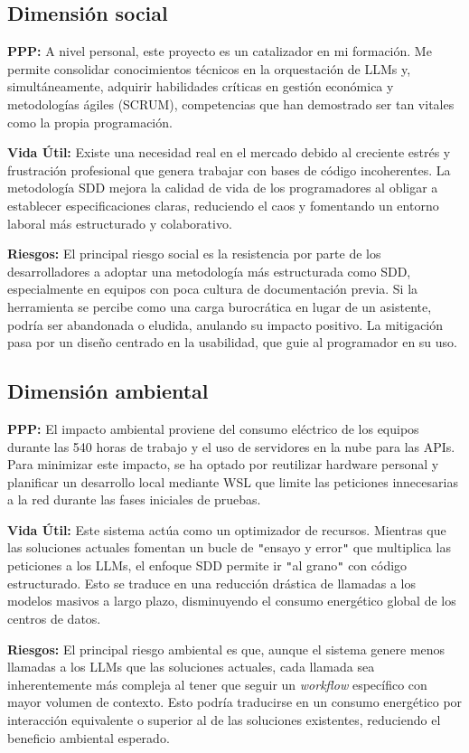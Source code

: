 \documentclass[11pt, letterpaper]{article}
\begin{document}
\subsection{Dimensión social}
\textbf{PPP:} A nivel personal, este proyecto es un catalizador en mi formación. Me permite consolidar conocimientos técnicos en la orquestación de LLMs y, simultáneamente, adquirir habilidades críticas en gestión económica y metodologías ágiles (SCRUM), competencias que han demostrado ser tan vitales como la propia programación.

\textbf{Vida Útil:} Existe una necesidad real en el mercado debido al creciente estrés y frustración profesional que genera trabajar con bases de código incoherentes. La metodología SDD mejora la calidad de vida de los programadores al obligar a establecer especificaciones claras, reduciendo el caos y fomentando un entorno laboral más estructurado y colaborativo.

\textbf{Riesgos:} El principal riesgo social es la resistencia por parte de los desarrolladores a adoptar una metodología más estructurada como SDD, especialmente en equipos con poca cultura de documentación previa. Si la herramienta se percibe como una carga burocrática en lugar de un asistente, podría ser abandonada o eludida, anulando su impacto positivo. La mitigación pasa por un diseño centrado en la usabilidad, que guie al programador en su uso.

\subsection{Dimensión ambiental}
\textbf{PPP:} El impacto ambiental proviene del consumo eléctrico de los equipos durante las 540 horas de trabajo y el uso de servidores en la nube para las APIs. Para minimizar este impacto, se ha optado por reutilizar hardware personal y planificar un desarrollo local mediante WSL que limite las peticiones innecesarias a la red durante las fases iniciales de pruebas.

\textbf{Vida Útil:} Este sistema actúa como un optimizador de recursos. Mientras que las soluciones actuales fomentan un bucle de \verb|"|ensayo y error\verb|"| que multiplica las peticiones a los LLMs, el enfoque SDD permite ir \verb|"|al grano\verb|"| con código estructurado. Esto se traduce en una reducción drástica de llamadas a los modelos masivos a largo plazo, disminuyendo el consumo energético global de los centros de datos.

\textbf{Riesgos:} El principal riesgo ambiental es que, aunque el sistema genere menos llamadas a los LLMs que las soluciones actuales, cada llamada sea inherentemente más compleja al tener que seguir un \textit{workflow} específico con mayor volumen de contexto. Esto podría traducirse en un consumo energético por interacción equivalente o superior al de las soluciones existentes, reduciendo el beneficio ambiental esperado.
\end{document}
